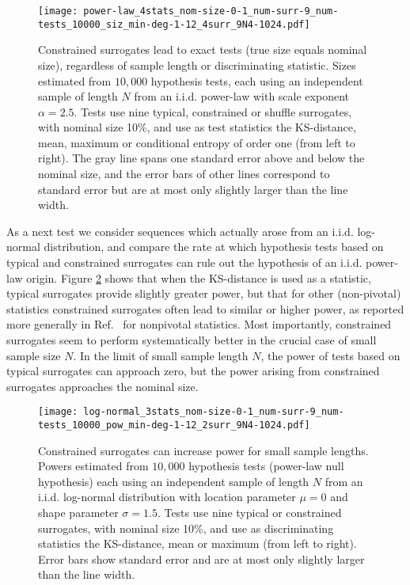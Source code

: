 \documentclass[%
prx,
reprint,
superscriptaddress,
nofootinbib,
 amsmath,amssymb,
 aps,
floatfix,
]{revtex4-2}
\begin{document}
\begin{figure}[htbp]
\texttt{[image: power-law\_4stats\_nom-size-0-1\_num-surr-9\_num-tests\_10000\_siz\_min-deg-1-12\_4surr\_9N4-1024.pdf]}

\caption{Constrained surrogates lead to exact tests (true size equals nominal size), regardless of sample length or discriminating statistic. Sizes estimated from $10,000$ hypothesis tests, each using an independent sample of length $N$ from an i.i.d. power-law with scale exponent $\alpha = 2.5$. Tests use nine typical, constrained or shuffle surrogates, with nominal size 10\%, and use as test statistics the KS-distance, mean, maximum or conditional entropy of order one (from left to right). The gray line spans one standard error above and below the nominal size, and the error bars of other lines correspond to standard error but are at most only slightly larger than the line width.
}
\label{fig:size}
\end{figure}

As a next test we consider sequences which actually arose from an i.i.d. log-normal distribution, and compare the rate at which hypothesis tests based on typical and constrained surrogates can rule out the hypothesis of an i.i.d. power-law origin. Figure \ref{fig:power_log_norm} shows that when the KS-distance is used as a statistic, typical surrogates provide slightly greater power, but that for other (non-pivotal) statistics constrained surrogates often lead to similar or higher power, as reported more generally in Ref.~\cite{theiler1996constrained} for nonpivotal statistics.  Most importantly, constrained surrogates seem to perform systematically better in the crucial case of small sample size $N$. In the limit of small sample length $N$, the power of tests based on typical surrogates can approach zero, but the power arising from constrained surrogates approaches the nominal size.

\begin{figure}[htbp]
\texttt{[image: log-normal\_3stats\_nom-size-0-1\_num-surr-9\_num-tests\_10000\_pow\_min-deg-1-12\_2surr\_9N4-1024.pdf]}
\caption{Constrained surrogates can increase power for small sample lengths. Powers estimated from $10,000$ hypothesis tests (power-law null hypothesis) each using an independent sample of length $N$ from an i.i.d. log-normal distribution with location parameter $\mu = 0$ and shape parameter $\sigma = 1.5$. Tests use nine typical or constrained surrogates, with nominal size 10\%, and use as discriminating statistics the KS-distance, mean or maximum (from left to right). Error bars show standard error and are at most only slightly larger than the line width.
}
\label{fig:power_log_norm}
\end{figure}
\end{document}
